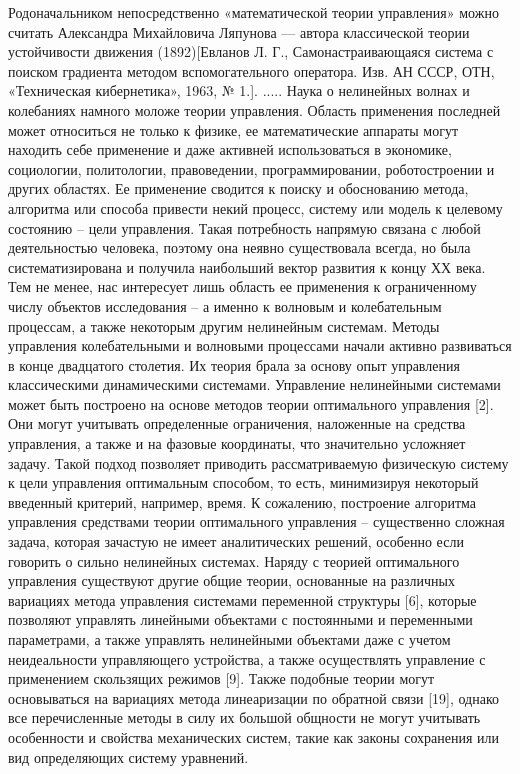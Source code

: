 Родоначальником непосредственно «математической теории управления» можно считать Александра Михайловича Ляпунова — автора классической теории устойчивости движения (1892)[Евланов Л. Г., Самонастраивающаяся система с поиском градиента методом вспомогательного оператора. Изв. АН СССР, ОТН, «Техническая кибернетика», 1963, № 1.].
.....
Наука о нелинейных волнах и колебаниях намного моложе теории управления. Область применения последней может относиться не только к физике, ее математические аппараты могут находить себе применение и даже активней использоваться в экономике, социологии, политологии, правоведении, программировании, роботостроении и других областях. Ее применение сводится к поиску и обоснованию метода, алгоритма или способа привести некий процесс, систему или модель к целевому состоянию – цели управления. Такая потребность напрямую связана с любой деятельностью человека, поэтому она неявно существовала всегда, но была систематизирована и получила наибольший вектор развития к концу ХХ века. Тем не менее, нас интересует лишь область ее применения к ограниченному числу объектов исследования – а именно к волновым и колебательным процессам, а также некоторым другим нелинейным системам.
Методы управления колебательными и волновыми процессами начали активно развиваться в конце двадцатого столетия. Их теория брала за основу опыт управления классическими динамическими системами. 
Управление нелинейными системами может быть построено на основе методов теории оптимального управления [2]. Они могут учитывать определенные ограничения, наложенные на средства управления, а также и на фазовые координаты, что значительно усложняет задачу. Такой подход позволяет приводить рассматриваемую физическую систему к цели управления оптимальным способом, то есть, минимизируя некоторый введенный критерий, например, время. К сожалению, построение алгоритма управления средствами теории оптимального управления – существенно сложная задача, которая зачастую не имеет аналитических решений, особенно если говорить о сильно нелинейных системах.
Наряду с теорией оптимального управления существуют другие общие теории, основанные на различных вариациях метода управления системами переменной структуры [6], которые позволяют управлять линейными объектами с постоянными и переменными параметрами, а также управлять нелинейными объектами даже с учетом неидеальности управляющего устройства, а также осуществлять управление с применением скользящих режимов [9]. Также подобные теории могут основываться на вариациях метода линеаризации по обратной связи [19], однако все перечисленные методы в силу их большой общности не могут учитывать особенности и свойства механических систем, такие как законы сохранения или вид определяющих систему уравнений.
